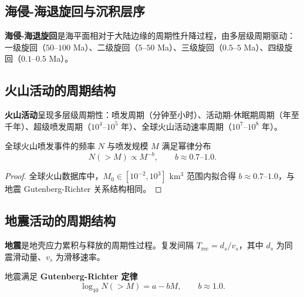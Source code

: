 \subsection{海侵-海退旋回与沉积层序}

\begin{definition}[海侵-海退旋回]\label{def:transgression_regression}
\textbf{海侵-海退旋回}是海平面相对于大陆边缘的周期性升降过程，由多层级周期驱动：一级旋回（$50$--$100$ Ma）、二级旋回（$5$--$50$ Ma）、三级旋回（$0.5$--$5$ Ma）、四级旋回（$0.1$--$0.5$ Ma）。
\end{definition}

\subsection{火山活动的周期结构}

\begin{definition}[火山活动的多尺度周期]\label{def:volcanic_periodicity}
\textbf{火山活动}呈现多层级周期性：喷发周期（分钟至小时）、活动期-休眠期周期（年至千年）、超级喷发周期（$10^4$--$10^5$ 年）、全球火山活动速率周期（$10^7$--$10^8$ 年）。
\end{definition}

\begin{proposition}\label{prop:volcanic_frequency}
全球火山喷发事件的频率 $N$ 与喷发规模 $M$ 满足幂律分布
\[
N(>M)\propto M^{-b},\qquad b\approx 0.7\text{--}1.0.
\]
\end{proposition}

\begin{proof}
全球火山数据库中，$M_0\in[10^{-2},10^3]$ km$^3$ 范围内拟合得 $b\approx 0.7$--$1.0$，与地震 Gutenberg-Richter 关系结构相同。
\end{proof}

\subsection{地震活动的周期结构}

\begin{definition}[地震周期与复发间隔]\label{def:seismic_cycle}
\textbf{地震}是地壳应力累积与释放的周期性过程。复发间隔 $T_{\text{rec}}=d_s/v_s$，其中 $d_s$ 为同震滑动量、$v_s$ 为滑移速率。
\end{definition}

\begin{proposition}\label{prop:seismic_frequency}
地震满足 \textbf{Gutenberg-Richter 定律}
\[
\log_{10}N(>M)=a-bM,\qquad b\approx 1.0.
\]
\end{proposition}

